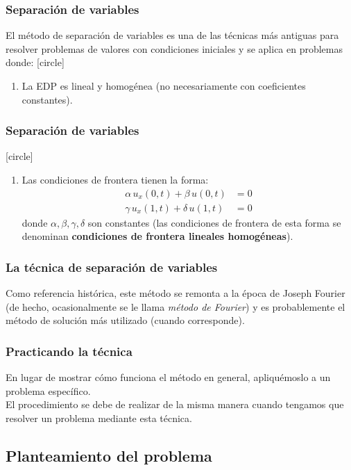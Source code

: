 \documentclass[12pt]{beamer}
\begin{document}
\begin{frame}
\frametitle{Separación de variables}
El método de separación de variables es una de las técnicas más antiguas para resolver problemas de valores con condiciones iniciales y se aplica en problemas donde:
[circle]
\begin{enumerate}[<+->]
\item La EDP es lineal y homogénea (no necesariamente con coeficientes constantes).
\seti
\end{enumerate}
\end{frame}
\begin{frame}
\frametitle{Separación de variables}
[circle]
\begin{enumerate}[<+->]
\conti    
\item Las condiciones de frontera tienen la forma:
\begin{align*}
\alpha \, u_{x} (0, t) + \beta \, u(0, t) &= 0 \\
\gamma \, u_{x} (1, t) + \delta \, u(1, t) &= 0
\end{align*}
donde $\alpha, \beta, \gamma, \delta$ son constantes (las condiciones de frontera de esta forma se denominan \textbf{condiciones de frontera lineales homogéneas}).
\end{enumerate}
\end{frame}
\begin{frame}
\frametitle{La técnica de separación de variables}
Como referencia histórica, este método se remonta a la época de Joseph Fourier (de hecho, ocasionalmente se le llama \emph{método de Fourier}) y es probablemente el método de solución más utilizado (cuando corresponde).
\end{frame}
\begin{frame}
\frametitle{Practicando la técnica}
En lugar de mostrar cómo funciona el método en general, apliquémoslo a un problema específico.
\\
\bigskip
\pause
El procedimiento se debe de realizar de la misma manera cuando tengamos que resolver un problema mediante esta técnica.
\end{frame}

\subsection{Planteamiento del problema}
\end{document}
